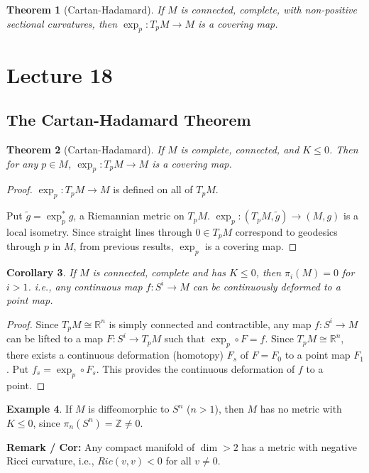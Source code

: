 \documentclass[11pt, a4paper]{article}
\theoremstyle{plain}
\newtheorem{theorem}{Theorem}[section]
\newtheorem{corollary}[theorem]{Corollary}
\theoremstyle{definition}
\newtheorem{example}[theorem]{Example}
\theoremstyle{remark}
\begin{document}
{\begin{theorem}[Cartan-Hadamard]
If $M$ is connected, complete, with non-positive sectional curvatures, then $\exp_p : T_pM \to M$ is a covering map.
\end{theorem}


}
\newpage
{
    \section{Lecture 18}
    \subsection{The Cartan-Hadamard Theorem}
    \begin{theorem}[Cartan-Hadamard]
If $M$ is complete, connected, and $K \le 0$. Then for any $p \in M$, $\exp_p : T_pM \to M$ is a covering map.
\end{theorem}

\begin{proof}
$\exp_p : T_pM \to M$ is defined on all of $T_pM$. 

Put $\tilde{g} = \exp_p^* g$, a Riemannian metric on $T_pM$. $\exp_p : (T_pM, \tilde{g}) \to (M, g)$ is a local isometry. Since straight lines through $0 \in T_pM$ correspond to geodesics through $p$ in $M$, from previous results, $\exp_p$ is a covering map.
\end{proof}

\begin{corollary}
If $M$ is connected, complete and has $K \le 0$, then $\pi_i(M) = 0$ for $i > 1$. i.e., any continuous map $f: S^i \to M$ can be continuously deformed to a point map.
\end{corollary}

\begin{proof}
Since $T_pM \cong \mathbb{R}^n$ is simply connected and contractible, any map $f: S^i \to M$ can be lifted to a map $F: S^i \to T_pM$ such that $\exp_p \circ F = f$.
Since $T_pM \cong \mathbb{R}^n$, there exists a continuous deformation (homotopy) $F_s$ of $F = F_0$ to a point map $F_1$. 
Put $f_s = \exp_p \circ F_s$. This provides the continuous deformation of $f$ to a point.
\end{proof}

\begin{example}
If $M$ is diffeomorphic to $S^n$ ($n > 1$), then $M$ has no metric with $K \le 0$, since $\pi_n(S^n) = \mathbb{Z} \neq 0$. 

\noindent \textbf{Remark / Cor:} Any compact manifold of $\dim > 2$ has a metric with negative Ricci curvature, i.e., $Ric(v,v) < 0$ for all $v \neq 0$.
\end{example}

}
\end{document}
